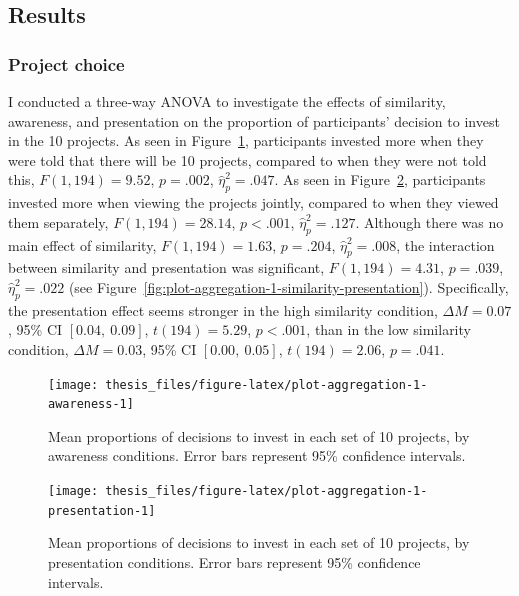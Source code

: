 \documentclass[a4paper, nobind, dvipsnames]{templates/ociamthesis}
\theoremstyle{definition}
\theoremstyle{definition}
\theoremstyle{definition}
\theoremstyle{definition}
\theoremstyle{remark}
\begin{document}
\hypertarget{results-aggregation-1}{%
\subsection{Results}\label{results-aggregation-1}}

\hypertarget{project-choice}{%
\subsubsection{Project choice}\label{project-choice}}

I conducted a three-way ANOVA to investigate the effects of similarity,
awareness, and presentation on the proportion of participants' decision to
invest in the 10 projects. As seen in
Figure~\ref{fig:plot-aggregation-1-awareness}, participants invested more when
they were told that there will be 10 projects, compared to when they were not
told this, \(F(1, 194) = 9.52\), \(p = .002\), \(\hat{\eta}^2_p = .047\). As seen in
Figure~\ref{fig:plot-aggregation-1-presentation}, participants invested more
when viewing the projects jointly, compared to when they viewed them separately,
\(F(1, 194) = 28.14\), \(p < .001\), \(\hat{\eta}^2_p = .127\). Although there was no main effect of
similarity, \(F(1, 194) = 1.63\), \(p = .204\), \(\hat{\eta}^2_p = .008\), the interaction between
similarity and presentation was significant,
\(F(1, 194) = 4.31\), \(p = .039\), \(\hat{\eta}^2_p = .022\) (see
Figure~\ref{fig:plot-aggregation-1-similarity-presentation}). Specifically, the
presentation effect seems stronger in the high similarity condition,
\(\Delta M = 0.07\), 95\% CI \([0.04,~0.09]\), \(t(194) = 5.29\), \(p < .001\), than in the low similarity
condition, \(\Delta M = 0.03\), 95\% CI \([0.00,~0.05]\), \(t(194) = 2.06\), \(p = .041\).



\begin{figure}
\texttt{[image: thesis\_files/figure-latex/plot-aggregation-1-awareness-1]} \caption{Mean proportions of decisions to invest in each set of 10 projects, by awareness conditions. Error bars represent 95\% confidence intervals.}\label{fig:plot-aggregation-1-awareness}
\end{figure}



\begin{figure}
\texttt{[image: thesis\_files/figure-latex/plot-aggregation-1-presentation-1]} \caption{Mean proportions of decisions to invest in each set of 10 projects, by presentation conditions. Error bars represent 95\% confidence intervals.}\label{fig:plot-aggregation-1-presentation}
\end{figure}
\end{document}
